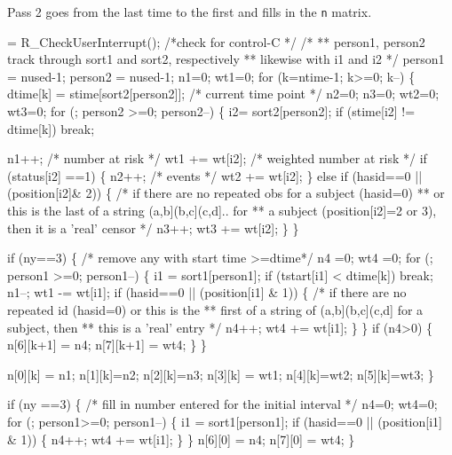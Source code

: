 \documentclass{article}
\newcommand{\code}[1]{\texttt{#1}}
\begin{document}
Pass 2 goes from the last time to the first and fills in the \code{n} matrix.
\begin{nwchunk}
=
 R_CheckUserInterrupt();  /*check for control-C */
 /*
 ** person1, person2 track through sort1 and sort2, respectively
 **  likewise with i1 and i2
 */
 person1 = nused-1;  person2 = nused-1;
 n1=0; wt1=0;
 for (k=ntime-1; k>=0; k--) \{
     dtime[k] = stime[sort2[person2]];  /* current time point */
     n2=0; n3=0; wt2=0; wt3=0; 
     for (; person2 >=0; person2--) \{
         i2= sort2[person2];
         if (stime[i2] != dtime[k]) break;
 
         n1++;             /* number at risk */
         wt1 += wt[i2];    /* weighted number at risk */
         if (status[i2] ==1) \{
             n2++;            /* events */
             wt2 += wt[i2];
         \} else if (hasid==0 || (position[i2]& 2)) \{
             /* if there are no repeated obs for a subject (hasid=0)
             **  or this is the last of a string (a,b](b,c](c,d].. for
             **  a subject (position[i2]=2 or 3), then it is a 'real' censor
             */
             n3++;
             wt3 += wt[i2];
         \}
     \}
     
     if (ny==3) \{ /* remove any with start time >=dtime*/
         n4 =0; wt4 =0;
         for (; person1 >=0; person1--) \{
             i1 = sort1[person1];
             if (tstart[i1] < dtime[k]) break;
             n1--;
             wt1 -= wt[i1];
             if (hasid==0 || (position[i1] & 1)) \{
                 /* if there are no repeated id (hasid=0) or this is the
                 ** first of a string of (a,b](b,c](c,d] for a subject, then
                 ** this is a 'real' entry */
                 n4++;
                 wt4 += wt[i1];
             \}
         \}
         if (n4>0) \{
            n[6][k+1] = n4;
            n[7][k+1] = wt4;
        \}
     \}
 
     n[0][k] = n1;  n[1][k]=n2;  n[2][k]=n3;
     n[3][k] = wt1; n[4][k]=wt2; n[5][k]=wt3; 
 \}
 
 if (ny ==3) \{   /* fill in number entered for the initial interval */
     n4=0; wt4=0;
     for (; person1>=0; person1--) \{
         i1 = sort1[person1];
         if (hasid==0 || (position[i1] & 1)) \{
             n4++;
             wt4 += wt[i1];
         \}
     \}
     n[6][0] = n4;    
     n[7][0] = wt4;
 \}
\end{nwchunk}
\end{document}
